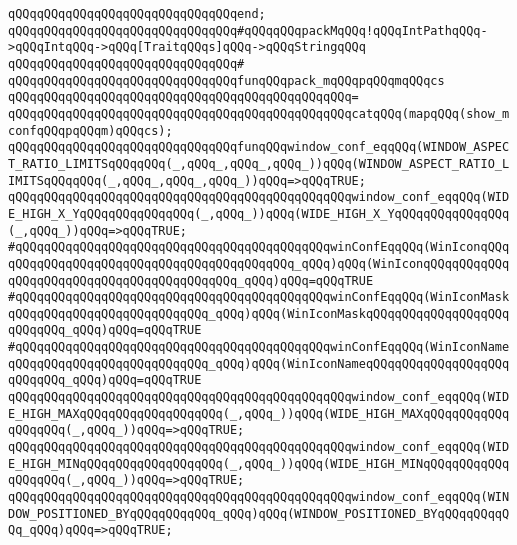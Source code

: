 \verb|qQQqqQQqqQQqqQQqqQQqqQQqqQQqqQQqend;|\newline
\newline
\newline
\verb|qQQqqQQqqQQqqQQqqQQqqQQqqQQqqQQq#qQQqqQQqpackMqQQq!qQQqIntPathqQQq->qQQqIntqQQq->qQQq[TraitqQQqs]qQQq->qQQqStringqQQq|\newline
\verb|qQQqqQQqqQQqqQQqqQQqqQQqqQQqqQQq#|\newline
\verb|qQQqqQQqqQQqqQQqqQQqqQQqqQQqqQQqfunqQQqpack_mqQQqpqQQqmqQQqcs|\newline
\verb|qQQqqQQqqQQqqQQqqQQqqQQqqQQqqQQqqQQqqQQqqQQqqQQq=|\newline
\verb|qQQqqQQqqQQqqQQqqQQqqQQqqQQqqQQqqQQqqQQqqQQqqQQqcatqQQq(mapqQQq(show_mconfqQQqpqQQqm)qQQqcs);|\newline
\newline
\verb|qQQqqQQqqQQqqQQqqQQqqQQqqQQqqQQqfunqQQqwindow_conf_eqqQQq(WINDOW_ASPECT_RATIO_LIMITSqQQqqQQq(_,qQQq_,qQQq_,qQQq_))qQQq(WINDOW_ASPECT_RATIO_LIMITSqQQqqQQq(_,qQQq_,qQQq_,qQQq_))qQQq=>qQQqTRUE;|\newline
\verb|qQQqqQQqqQQqqQQqqQQqqQQqqQQqqQQqqQQqqQQqqQQqqQQqwindow_conf_eqqQQq(WIDE_HIGH_X_YqQQqqQQqqQQqqQQq(_,qQQq_))qQQq(WIDE_HIGH_X_YqQQqqQQqqQQqqQQq(_,qQQq_))qQQq=>qQQqTRUE;|\newline
\newline
\verb|#qQQqqQQqqQQqqQQqqQQqqQQqqQQqqQQqqQQqqQQqqQQqwinConfEqqQQq(WinIconqQQqqQQqqQQqqQQqqQQqqQQqqQQqqQQqqQQqqQQqqQQq_qQQq)qQQq(WinIconqQQqqQQqqQQqqQQqqQQqqQQqqQQqqQQqqQQqqQQqqQQq_qQQq)qQQq=qQQqTRUE|\newline
\verb|#qQQqqQQqqQQqqQQqqQQqqQQqqQQqqQQqqQQqqQQqqQQqwinConfEqqQQq(WinIconMaskqQQqqQQqqQQqqQQqqQQqqQQqqQQq_qQQq)qQQq(WinIconMaskqQQqqQQqqQQqqQQqqQQqqQQqqQQq_qQQq)qQQq=qQQqTRUE|\newline
\verb|#qQQqqQQqqQQqqQQqqQQqqQQqqQQqqQQqqQQqqQQqqQQqwinConfEqqQQq(WinIconNameqQQqqQQqqQQqqQQqqQQqqQQqqQQq_qQQq)qQQq(WinIconNameqQQqqQQqqQQqqQQqqQQqqQQqqQQq_qQQq)qQQq=qQQqTRUE|\newline
\newline
\verb|qQQqqQQqqQQqqQQqqQQqqQQqqQQqqQQqqQQqqQQqqQQqqQQqwindow_conf_eqqQQq(WIDE_HIGH_MAXqQQqqQQqqQQqqQQqqQQq(_,qQQq_))qQQq(WIDE_HIGH_MAXqQQqqQQqqQQqqQQqqQQq(_,qQQq_))qQQq=>qQQqTRUE;|\newline
\verb|qQQqqQQqqQQqqQQqqQQqqQQqqQQqqQQqqQQqqQQqqQQqqQQqwindow_conf_eqqQQq(WIDE_HIGH_MINqQQqqQQqqQQqqQQqqQQq(_,qQQq_))qQQq(WIDE_HIGH_MINqQQqqQQqqQQqqQQqqQQq(_,qQQq_))qQQq=>qQQqTRUE;|\newline
\verb|qQQqqQQqqQQqqQQqqQQqqQQqqQQqqQQqqQQqqQQqqQQqqQQqwindow_conf_eqqQQq(WINDOW_POSITIONED_BYqQQqqQQqqQQq_qQQq)qQQq(WINDOW_POSITIONED_BYqQQqqQQqqQQq_qQQq)qQQq=>qQQqTRUE;|\newline
